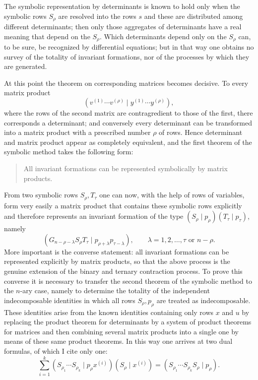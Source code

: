 \documentclass[11pt]{article}
\begin{document}
The symbolic representation by determinants is known to hold only when the symbolic rows $S_\rho$ are resolved into the rows $s$ and these are distributed among different determinants; then only those aggregates of determinants have a real meaning that depend on the $S_\rho$. Which determinants depend only on the $S_\rho$ can, to be sure, be recognized by differential equations; but in that way one obtains no survey of the totality of invariant formations, nor of the processes by which they are generated.

At this point the theorem on corresponding matrices becomes decisive. To every matrix product
\[
(v^{(1)}\cdots v^{(\rho)} \mid y^{(1)}\cdots y^{(\rho)}),
\]
where the rows of the second matrix are contragredient to those of the first, there corresponds a determinant; and conversely every determinant can be transformed into a matrix product with a prescribed number $\rho$ of rows. Hence determinant and matrix product appear as completely equivalent, and the first theorem of the symbolic method takes the following form:

\begin{quote}
All invariant formations can be represented symbolically by matrix products.
\end{quote}

From two symbolic rows $S_\rho,T_\tau$ one can now, with the help of rows of variables, form very easily a matrix product that contains these symbolic rows explicitly and therefore represents an invariant formation of the type $(S_\rho\mid p_\rho)(T_\tau\mid p_\tau)$, namely
\[
(G_{n-\rho-\lambda}S_\rho T_\tau \mid p_{\rho+\lambda}p_{\tau-\lambda}),
\qquad
\lambda = 1,2,\dots,\tau \text{ or } n-\rho.
\tag{1}
\]
More important is the converse statement: all invariant formations can be represented explicitly by matrix products, so that the above process is the genuine extension of the binary and ternary contraction process. To prove this converse it is necessary to transfer the second theorem of the symbolic method to the $n$-ary case, namely to determine the totality of the independent indecomposable identities in which all rows $S_\rho,p_\rho$ are treated as indecomposable. These identities arise from the known identities containing only rows $x$ and $u$ by replacing the product theorem for determinants by a system of product theorems for matrices and then combining several matrix products into a single one by means of these same product theorems. In this way one arrives at two dual formulas, of which I cite only one:
\[
\sum_{i=1}^{k} (S_{\rho_1}\cdots S_{\rho_k}\mid p_\rho x^{(i)})(S_\rho\mid x^{(i)})
=
(S_{\rho_1}\cdots S_{\rho_k}S_\rho\mid p_\rho).
\tag{2}
\]
\end{document}
